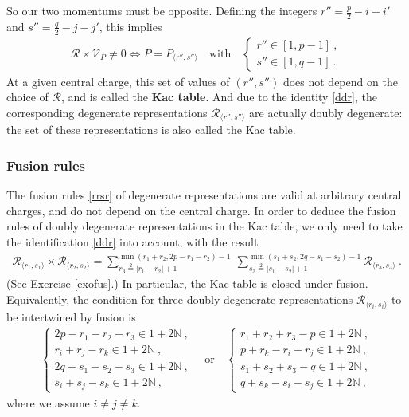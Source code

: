 \documentclass[12pt, a4paper, notitlepage, twoside]{report}
\numberwithin{equation}{section}
\theoremstyle{break}
\begin{document}
So our two momentums must be opposite. Defining the integers $r'' = \frac{p}{2}-i-i'$ and $s''=\frac{q}{2}-j-j'$, this implies
\begin{align}
 \mathcal{R}\times \mathcal{V}_P \neq 0 \iff    P=P_{\langle r'',s'' \rangle}\quad \text{with}\quad  \left\{\begin{array}{l}  r'' \in [1,p-1]\ , \\ s'' \in [1,q-1]\ . \end{array}\right. 
\label{rpsq}
\end{align}
At a given central charge, this set of values of $(r'', s'')$ does not depend on the choice of $\mathcal{R}$, and is called the \textbf{\boldmath Kac table}.
And due to the identity \eqref{ddr},
the corresponding degenerate representations $\mathcal{R}_{\langle r'', s'' \rangle}$ are actually doubly degenerate: the set of these representations is also called the Kac table.

\subsubsection{Fusion rules}

The fusion rules \eqref{rrsr} of degenerate representations are valid at arbitrary central charges, and do not depend on the central charge. In order to deduce the fusion rules of doubly degenerate representations in the Kac table, we only need to take the identification \eqref{ddr} into account, with the result
\begin{align}
  \boxed{\mathcal{R}_{\langle r_1,s_1 \rangle} \times \mathcal{R}_{\langle r_2,s_2 \rangle} = \sum_{r_3\overset{2}{=}|r_1-r_2|+1}^{\min(r_1+r_2,2p-r_1-r_2)-1}\ \sum_{s_3\overset{2}{=}|s_1-s_2|+1}^{\min(s_1+s_2,2q-s_1-s_2)-1} \mathcal{R}_{\langle r_3,s_3 \rangle}}\ .
\label{rrmm}
\end{align}
(See Exercise \ref{exofus}.) In particular, the Kac table is closed under fusion.
Equivalently, 
the condition for three doubly degenerate representations $\mathcal{R}_{\langle r_i,s_i \rangle}$ to be intertwined by fusion is 
\begin{align}
 \left\{\begin{array}{l}  2p-r_1-r_2-r_3\in 1+2{\mathbb{N}}\ , \\
 r_i+r_j-r_k \in 1 + 2{\mathbb{N}}\ , \\
2q-s_1-s_2-s_3\in 1+2{\mathbb{N}}\ , \\
 s_i+s_j-s_k \in 1 + 2{\mathbb{N}}\ , \end{array}\right.  
\quad \text{or} \quad
 \left\{\begin{array}{l}  r_1+r_2+r_3-p\in 1+2{\mathbb{N}}\ , \\
 p+r_k-r_i-r_j\in 1+2{\mathbb{N}} \ , \\
s_1+s_2+s_3-q\in 1+2{\mathbb{N}}\ , \\
 q+s_k-s_i-s_j\in 1+2{\mathbb{N}} \ ,\end{array}\right. 
 \label{mmfr}
\end{align}
where we assume $i\neq j\neq k$.
\end{document}
